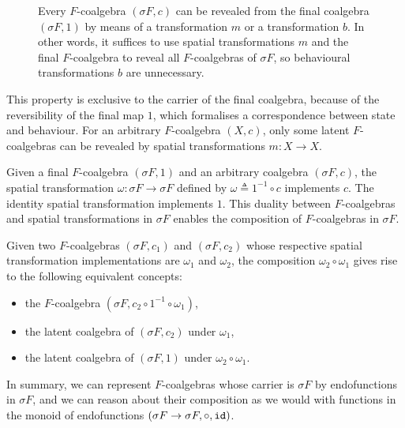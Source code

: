 \begin{figure}[t] 
    \centering
    \caption{Every $F$-coalgebra $(\sigma F, c)$ can be revealed from the final coalgebra $(\sigma F,1)$ by means of a transformation $m$ or a transformation $b$. In other words, it suffices to use spatial transformations $m$ and the final $F$-coalgebra to reveal all $F$-coalgebras of $\sigma F$, so behavioural transformations $b$ are unnecessary.}
    \label{fig:FinalEquivalence} 
\end{figure}
This property is exclusive to the carrier of the final coalgebra, because of the reversibility of the final map $1$, which formalises a correspondence between state and behaviour. For an arbitrary $F$-coalgebra $(X,c)$, only some latent $F$-coalgebras can be revealed by spatial transformations $m\colon X\rightarrow X$.

Given a final $F$-coalgebra $(\sigma F, 1)$ and an arbitrary coalgebra $(\sigma F, c)$, the spatial transformation $\omega\colon \sigma F\rightarrow \sigma F$ defined by $\omega\triangleq 1^{-1}\circ c$ implements $c$. The identity spatial transformation implements $1$. This duality between $F$-coalgebras and spatial transformations in $\sigma F$ enables the composition of $F$-coalgebras in $\sigma F$.

Given two $F$-coalgebras $(\sigma F, c_1)$ and $(\sigma F, c_2)$ whose respective spatial transformation implementations are $\omega_1$ and $\omega_2$, the composition $\omega_2\circ \omega_1$ gives rise to the following equivalent concepts:
\begin{itemize}
    \item the $F$-coalgebra $(\sigma F, c_2\circ 1^{-1}\circ\omega_1)$,
    \item the latent coalgebra of $(\sigma F, c_2)$ under $\omega_1$,
    \item the latent coalgebra of $(\sigma F, 1)$ under $\omega_2\circ \omega_1$.
\end{itemize}
In summary, we can represent $F$-coalgebras whose carrier is $\sigma F$ by endofunctions in $\sigma F$, and we can reason about their composition as we would with functions in the monoid of endofunctions $(\sigma F\rightarrow \sigma F, \circ, {\texttt{id}})$.

